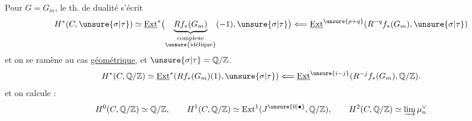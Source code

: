 Pour $G=G_m$, le th. de dualité s'écrit 
\[
H^*(C,\unsure{\sigma|\tau})\simeq
\underline{\operatorname{Ext}}^*\bigl(\underbrace{Rf_*(G_m)}_{\substack{\text{complexe}\\\text{\unsure{idélique}}}}(-1),\unsure{\sigma|\tau}\bigr)
\Longleftarrow\underline{\operatorname{Ext}}^{\unsure{p+q}}(R^{-q}f_*(G_m),\unsure{\sigma|\tau})
\]
et on se ramène au cas \uline{géométrique}, et $\unsure{\sigma|\tau}=\mathbb Q/\mathbb Z$.
\[
H^*(C,\mathbb Q/\mathbb Z)\simeq\underline{\operatorname{Ext}}^*(Rf_*(G_m)(1),\unsure{\sigma|\tau})
\Longleftarrow\underline{\operatorname{Ext}}^{\unsure{i-j}}(R^{-j}f_*(G_m),\mathbb Q/\mathbb Z).
\]
et on calcule :
\[
H^0(C,\mathbb Q/\mathbb Z)\simeq\mathbb Q/\mathbb Z,\qquad
H^1(C,\mathbb Q/\mathbb Z)\simeq\operatorname{Ext}^1(J^{\unsure{0|\bullet}},\mathbb Q/\mathbb Z),\qquad
H^2(C,\mathbb Q/\mathbb Z)\simeq\varinjlim\mu_n^\vee
\]

